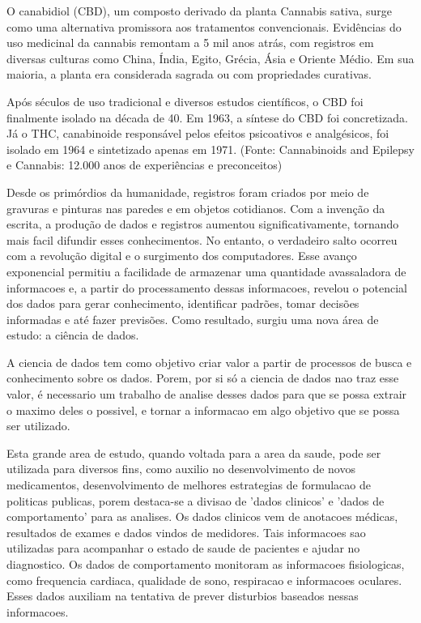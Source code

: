 \documentclass[article,a4paper,12pt,brazil,sumario=tradicional]{abntex2}
\begin{document}
O canabidiol (CBD), um composto derivado da planta Cannabis sativa, surge como uma alternativa promissora aos tratamentos convencionais. Evidências do uso medicinal da cannabis remontam a 5 mil anos atrás, com registros em diversas culturas como China, Índia, Egito, Grécia, Ásia e Oriente Médio. Em sua maioria, a planta era considerada sagrada ou com propriedades curativas.

Após séculos de uso tradicional e diversos estudos científicos, o CBD foi finalmente isolado na década de 40. Em 1963, a síntese do CBD foi concretizada. Já o THC, canabinoide responsável pelos efeitos psicoativos e analgésicos, foi isolado em 1964 e sintetizado apenas em 1971. (Fonte: Cannabinoids and Epilepsy e Cannabis: 12.000 anos de experiências e preconceitos)

Desde os primórdios da humanidade, registros foram criados por meio de gravuras e pinturas nas paredes e em objetos cotidianos. Com a invenção da escrita, a produção de dados e registros aumentou significativamente, tornando mais facil difundir esses conhecimentos. No entanto, o verdadeiro salto ocorreu com a revolução digital e o surgimento dos computadores. Esse avanço exponencial permitiu a facilidade de armazenar uma quantidade avassaladora de informacoes e, a partir do processamento dessas informacoes, revelou o potencial dos dados para gerar conhecimento, identificar padrões, tomar decisões informadas e até fazer previsões. Como resultado, surgiu uma nova área de estudo: a ciência de dados.

A ciencia de dados tem como objetivo criar valor a partir de processos de busca e conhecimento sobre os dados. Porem, por si só a ciencia de dados nao traz esse valor, é necessario um trabalho de analise desses dados para que se possa extrair o maximo deles o possivel, e tornar a informacao em algo objetivo que se possa ser utilizado.

Esta grande area de estudo, quando voltada para a area da saude, pode ser utilizada para diversos fins, como auxilio no desenvolvimento de novos medicamentos, desenvolvimento de melhores estrategias de formulacao de politicas publicas, porem destaca-se a divisao de 'dados clinicos' e 'dados de comportamento' para as analises. Os dados clinicos vem de anotacoes médicas, resultados de exames e dados vindos de medidores. Tais informacoes sao utilizadas para acompanhar o estado de saude de pacientes e ajudar no diagnostico. Os dados de comportamento monitoram as informacoes fisiologicas, como frequencia cardiaca, qualidade de sono, respiracao e informacoes oculares. Esses dados auxiliam na tentativa de prever disturbios baseados nessas informacoes. 
\end{document}
